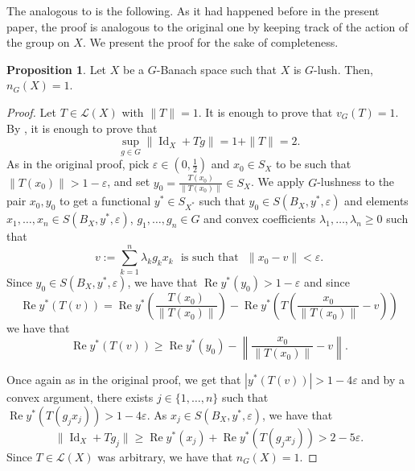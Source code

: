 \documentclass[a4paper,12pt]{amsart}
\theoremstyle{definition}
\newtheorem{proposition}[theorem]{Proposition}
\theoremstyle{definition}
\theoremstyle{remark}
\numberwithin{equation}{section}
\DeclareMathOperator{\re}{Re}
\DeclareMathOperator{\id}{Id}
\renewcommand{\geq}{\geqslant}
\newcommand{\<}{\langle}
\renewcommand{\>}{\rangle}
\newcommand{\e}{\varepsilon}
\begin{document}
	
	The analogous to \cite[Proposition 2.2]{BoykoKadetsMartinWerner2007} is the following. As it had happened before in the present paper, the proof is analogous to the original one by keeping track of the action of the group on $X$. We present the proof for the sake of completeness.
	
	\begin{proposition}
		Let $X$ be a $G$-Banach space such that $X$ is $G$-lush. Then, $n_{G}(X)=1$.
	\end{proposition}
	
	\begin{proof} Let $T \in \mathcal{L}(X)$ with $\|T\|= 1$. It is enough to prove that $v_G(T) = 1$. By , it is enough to prove that
		\begin{equation*}
			\sup_{g \in G} \| \id_X + Tg\| = 1 + \|T\| = 2.
		\end{equation*}
		As in the original proof, pick $\e \in (0,\frac{1}{2})$ and $x_0 \in S_X$ to be such that $\|T(x_0)\| > 1 - \e$, and set $y_0 = \frac{T(x_0)}{\|T(x_0)\|} \in S_X$. We apply $G$-lushness to the pair $x_0, y_0$ to get a functional $y^* \in S_{X^*}$ such that $y_0 \in S(B_X, y^*, \e)$ and elements $x_1, \ldots, x_n \in S(B_X, y^*, \e)$, $g_1, \ldots, g_n \in G$ and convex coefficients $\lambda_1, \ldots, \lambda_n \geq 0$ such that 
		\begin{equation*}
			v:= \sum_{k=1}^n \lambda_k g_k x_k \ \ \ \mbox{is such that} \ \ \ \|x_0 - v\| < \e.
		\end{equation*}
		Since $y_0 \in S(B_X, y^*, \e)$, we have that $\re y^*(y_0) > 1 - \e$ and since 
		\begin{equation*}
			\re y^*(T(v)) = \re y^* \left( \frac{T(x_0)}{\|T(x_0)\|}\right) - \re y^* \left( T \left( \frac{x_0}{\|T(x_0)\|} - v \right) \right) 
		\end{equation*}
		we have that 
		\begin{equation*}
			\re y^*(T(v)) \geq \re y^*(y_0) - \left\| \frac{x_0}{\|T(x_0)\|} - v \right\|.
		\end{equation*}
		
		Once again as in the original proof, we get that $|y^*(T(v))| > 1 - 4 \e$ and by a convex argument, there exists $j \in \{1, \ldots, n\}$ such that $\re y^*(T(g_j x_j)) > 1 - 4\e$. As $x_j \in S(B_X, y^*, \e)$, we have that 
		\begin{equation*}
			\| \id_X + T g_j\| \geq \re y^*(x_j) + \re y^*(T(g_j x_j)) > 2 - 5\e.
		\end{equation*}
		Since $T \in \mathcal{L}(X)$ was arbitrary, we have that $n_{G}(X) = 1$.
	\end{proof}
	
\end{document}
